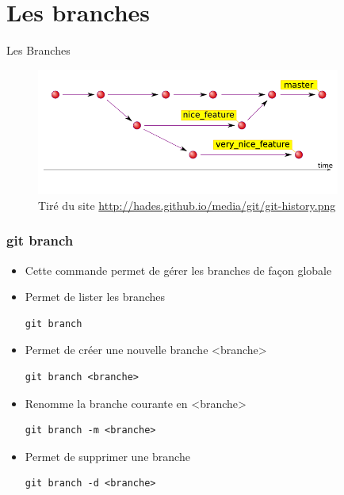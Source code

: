 \documentclass{beamer}
\begin{document}
\section{Les branches}

\begin{frame}{Les Branches}
\begin{figure}
    \centering
    \includegraphics[width=10cm]{img/git-history.png}
    \caption{Tiré du site \url{http://hades.github.io/media/git/git-history.png}}
\end{figure}
\end{frame}

\begin{frame}[fragile]
\frametitle{git branch}

\begin{itemize}
\item Cette commande permet de gérer les branches de façon globale
\item Permet de lister les branches
\begin{lstlisting}
git branch
\end{lstlisting}
\item Permet de créer une nouvelle branche <branche>
\begin{lstlisting}
git branch <branche>
\end{lstlisting}
\item Renomme la branche courante en <branche>
\begin{lstlisting}
git branch -m <branche>
\end{lstlisting}
\item Permet de supprimer une branche
\begin{lstlisting}
git branch -d <branche>
\end{lstlisting}
\end{itemize}
\end{frame}
\end{document}
